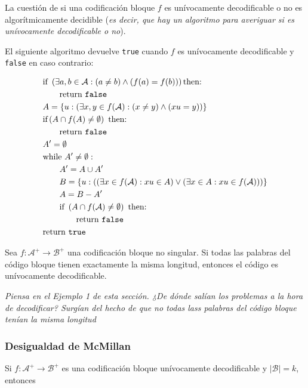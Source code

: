La cuestión de si una codificación bloque \(f\) es unívocamente
decodificable o no es algorítmicamente decidible (\emph{es decir, que
hay un algoritmo para averiguar si es unívocamente decodificable o no}).

El siguiente algoritmo devuelve \texttt{true} cuando \(f\) es
unívocamente decodificable y \texttt{false} en caso contrario:


\begin{align*}
&\text{if }\left(\exists a,b\in\mathcal{A}: (a\neq b)\wedge(f(a)=f(b))\right)\text{then:}\\
&\quad\quad\text{return \texttt{false}}\\
&A=\left\{u: \left(\exists x,y\in f(\mathcal{A}):(x\neq y)\wedge (xu=y)\right)\right\}\\
&\text{if}\left(A\cap f(A)\neq\emptyset\right)\text{ then:}\\
&\quad\quad\text{return \texttt{false}}\\
&A'=\emptyset\\
&\text{while }A'\neq\emptyset:\\
&\quad\quad A'=A\cup A'\\
&\quad\quad B = \left\{u:\left(\left(\exists x\in f(\mathcal{A}): xu\in A\right)\vee\left(\exists x\in A: xu\in f(\mathcal{A})\right)\right)\right\}\\
&\quad\quad A = B - A'\\
&\quad\quad\text{if }\left(A\cap f(\mathcal{A})\neq\emptyset\right)\text{ then:}\\
&\quad\quad\quad\quad\text{return \texttt{false}}\\
&\text{return \texttt{true}}\\
\end{align*}


Sea \(f:\mathcal{A}^+\rightarrow\mathcal{B}^+\) una codificación bloque
no singular. Si todas las palabras del código bloque tienen exactamente
la misma longitud, entonces el código es unívocamente decodificable.

\emph{Piensa en el Ejemplo 1 de esta sección. ¿De dónde salían los
problemas a la hora de decodificar? Surgían del hecho de que no todas
lass palabras del código bloque tenían la misma longitud}

\subsubsection{Desigualdad de McMillan}\label{desigualdad-de-mcmillan}

Si \(f:\mathcal{A}^+\rightarrow\mathcal{B}^+\) es una codificación
bloque unívocamente decodificable y \(\left|\mathcal{B}\right|=k\),
entonces

